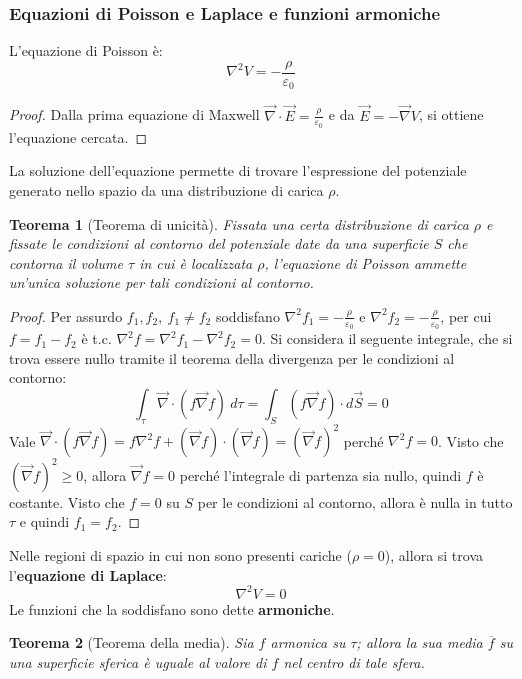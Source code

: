 \documentclass[a4paper]{scrartcl}
\numberwithin{equation}{subsection}
\theoremstyle{style1}
\newtheorem{teorema}{Teorema}[section]
\newenvironment{boxenv}[1][]{
    \begin{eqbox}[#1]
    }{
   \end{eqbox}
}
\begin{document}
\subsubsection{Equazioni di Poisson e Laplace e funzioni armoniche}
L'equazione di Poisson \`e:
\begin{equation}
	\nabla ^2 V = -\frac{\rho }{\varepsilon _0}
\end{equation}
\begin{boxenv}[]
\begin{proof}
	Dalla prima equazione di Maxwell $\vec{\nabla }\cdot \vec{E} = \frac{\rho }{\varepsilon _0}$ e da $\vec{E}= - \vec{\nabla }V$, si ottiene l'equazione cercata.
\end{proof}
\end{boxenv}
\noindent La soluzione dell'equazione permette di trovare l'espressione del potenziale generato nello spazio da una distribuzione di carica $\rho $.
\begin{teorema}
	[Teorema di unicit\`a]
Fissata una certa distribuzione di carica $\rho $ e fissate le condizioni al contorno del potenziale date da una superficie $S$ che contorna il volume $\tau $ in cui \`e localizzata $\rho $, l'equazione di Poisson ammette un'unica soluzione per tali condizioni al contorno.
\end{teorema}
\begin{boxenv}[]
\begin{proof}
	Per assurdo $f_1,f_2, \ f_1\neq f_2$ soddisfano $\nabla ^2 f_1 = - \frac{\rho}{\varepsilon _0}$ e $\nabla ^2 f_2 = - \frac{\rho }{\varepsilon _0}$, per cui $f=f_1-f_2$ \`e t.c. $\nabla ^2 f = \nabla ^2 f_1 - \nabla ^2 f_2=0$. Si considera il seguente integrale, che si trova essere nullo tramite il teorema della divergenza per le condizioni al contorno:
	\[
	\int_{\tau } \vec{\nabla }\cdot  (f\vec{\nabla }f) \ d\tau = \int_{S}  (f\vec{\nabla }f) \cdot d\vec{S} = 0
	\] 
	Vale $\vec{\nabla }\cdot  (f\vec{\nabla }f) = f \nabla ^2 f + (\vec{\nabla }f) \cdot (\vec{\nabla }f)=(\vec{\nabla  }f)^2$ perch\'e $\nabla^2 f =0$. Visto che $(\vec{\nabla }f)^2\ge 0$, allora $\vec{\nabla }f=0$ perch\'e l'integrale di partenza sia nullo, quindi $f$ \`e costante. Visto che $f=0$ su $S$ per le condizioni al contorno, allora \`e nulla in tutto $\tau $ e quindi $f_1=f_2$.
\end{proof}
\end{boxenv}
\noindent Nelle regioni di spazio in cui non sono presenti cariche ($\rho =0$), allora si trova l'\textbf{equazione di Laplace}:
\begin{equation}
	\nabla ^2 V = 0
\end{equation}
Le funzioni che la soddisfano sono dette \textbf{armoniche}.
\begin{teorema}
	[Teorema della media]
	Sia $f$ armonica su $\tau $; allora la sua media $\overline{f}$ su una superficie sferica \`e uguale al valore di $f$ nel centro di tale sfera.
\end{teorema}
\end{document}
